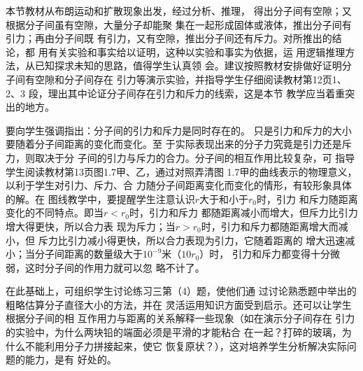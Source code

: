 本节教材从布朗运动和扩散现象出发，经过分析、推理，
得出分子间有空隙；又根据分子间虽有空隙，大量分子却能聚
集在一起形成固体或液体，推出分子间有引力；再由分子间既
有引力，又有空隙，推出分子间还有斥力。对所推出的结论，都
用有关实验和事实给以证明，这种以实验和事实为依据，运
用逻辑推理方法，从已知探求未知的思路，值得学生认真领
会。建议按照教材安排做好证明分子间有空隙和分子间存在
引力等演示实验，并指导学生仔细阅读教材第12页1、2、3
段，理出其中论证分子间存在引力和斥力的线索，这是本节
教学应当着重突出的地方。

要向学生强调指出：分子间的引力和斥力是同时存在的。
只是引力和斥力的大小要随着分子间距离的变化而变化。至
于实际表现出来的分子力究竟是引力还是斥力，则取决于分
子间的引力与斥力的合力。分子间的相互作用比较复杂，可
指导学生阅读教材第13页图1.7甲、乙，通过对照弄清图
1.7甲的曲线表示的物理意义，以利于学生对引力、斥力、合
力随分子间距离变化而变化的情形，有较形象具体的解。在
图线教学中，要提醒学生注意认识$r$大于和小于$r_0$时，引力
和斥力随距离变化的不同特点。即当$r<r_0$时，引力和斥力
都随距离减小而增大，但斥力比引力增大得更快，所以合力表
现为斥力；当$r>r_0$时，引力和斥力都随距离增大而减小，但
斥力比引力减小得更快，所以合力表现为引力，它随着距离的
增大迅速减小；当分子间距离的数量级大于$10^{-9}$米（$10r_0$）时，
引力和斥力都变得十分微弱，这时分子间的作用力就可以忽
略不计了。

在此基础上，可组织学生讨论练习三第（4）题，使他们通
过讨论熟悉题中举出的粗略估算分子直径大小的方法，并在
灵活运用知识方面受到启示。还可以让学生根据分子间的相
互作用力与距离的关系解释一些现象（如在演示分子间存在
引力的实验中，为什么两块铅的端面必须是平滑的才能粘合
在一起？打碎的玻璃，为什么不能利用分子力拼接起来，使它
恢复原状？），这对培养学生分析解决实际问题的能力，是有
好处的。





